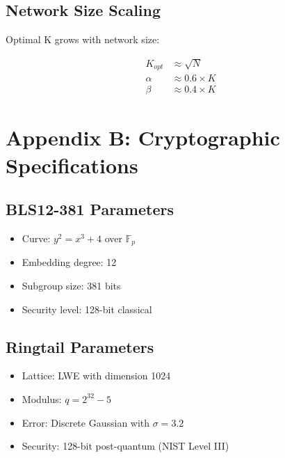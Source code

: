 \documentclass[11pt]{article}
\begin{document}
\subsection{Network Size Scaling}

Optimal K grows with network size:

\begin{align}
K_{opt} &\approx \sqrt{N} \\
\alpha &\approx 0.6 \times K \\
\beta &\approx 0.4 \times K
\end{align}

\section{Appendix B: Cryptographic Specifications}

\subsection{BLS12-381 Parameters}
\begin{itemize}
\item Curve: $y^2 = x^3 + 4$ over $\mathbb{F}_p$
\item Embedding degree: 12
\item Subgroup size: 381 bits
\item Security level: 128-bit classical
\end{itemize}

\subsection{Ringtail Parameters}
\begin{itemize}
\item Lattice: LWE with dimension 1024
\item Modulus: $q = 2^{32} - 5$
\item Error: Discrete Gaussian with $\sigma = 3.2$
\item Security: 128-bit post-quantum (NIST Level III)
\end{itemize}
\end{document}
